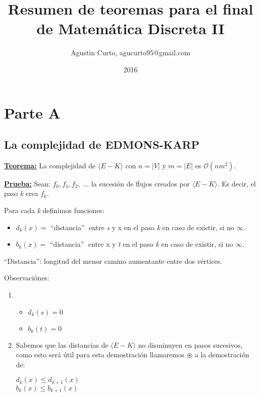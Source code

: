 \documentclass[12pt,a4paper]{report}
\author{Agustin Curto, agucurto95@gmail.com}
\title{Resumen de teoremas para el final \\ de Matemática Discreta  II}
\date{2016}
\providecommand{\abs}[1]{\lvert#1\rvert}
\begin{document}
\maketitle
\tableofcontents


\chapter{Parte A}

	\section{La complejidad de EDMONS-KARP}
	
		\textbf{\underline{Teorema:}} La complejidad de $\langle E-K \rangle$ con $n = \abs{V}$ y $m = \abs{E}$ es $\mathcal{O}(nm^{2})$.
	
		\textbf{\underline{Prueba:}} Sean: $f_{0}, f_{1}, f_{2}, \; \dotsc$ \;  la sucesión de flujos creados por $\langle E-K \rangle$. Es decir, el paso \textit{k} crea $f_{k}$.
		
		\vspace{5mm}
		Para cada \textit{k} definimos funciones:
		
		\begin{itemize}
			\item $d_{k}(x) =$ \textquotedblleft distancia\textquotedblright $\;$ entre \textit{s} y x en el paso \textit{k} en caso de existir, si no $\infty$.
			\item $b_{k}(x) =$ \textquotedblleft distancia\textquotedblright $\;$ entre x y \textit{t} en el paso \textit{k} en caso de existir, si no $\infty$.
		\end{itemize}
	
		\textquotedblleft Distancia\textquotedblright: longitud del menor camino aumentante entre dos vértices.
		
		\vspace{5mm}
		Observaciónes:
			\begin{enumerate}
				\item
					\begin{itemize}
						\item $d_{k}(s) = 0$
						\item $b_{k}(t) = 0$
					\end{itemize}
				\item Sabemos que las distancias de $\langle E-K \rangle$ no disminuyen en pasos sucesivos, como esto será útil para esta demostración llamaremos $\circledast$ a la demostración de:
			\begin{center}
				$d_{k}(x) \leq d_{k+1}(x)$ \\
				$b_{k}(x) \leq b_{k+1}(x)$
			\end{center}
			\end{enumerate}
\end{document}
